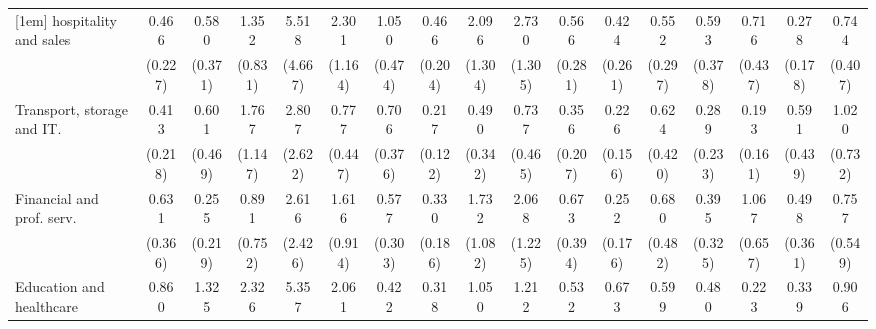 {\begin{tabular}{l*{16}{c}}
[1em]
hospitality and sales&       0.466         &       0.580         &       1.352         &       5.518\sym{*}  &       2.301         &       1.050         &       0.466         &       2.096         &       2.730\sym{*}  &       0.566         &       0.424         &       0.552         &       0.593         &       0.716         &       0.278\sym{*}  &       0.744         \\
                    &     (0.227)         &     (0.371)         &     (0.831)         &     (4.667)         &     (1.164)         &     (0.474)         &     (0.204)         &     (1.304)         &     (1.305)         &     (0.281)         &     (0.261)         &     (0.297)         &     (0.378)         &     (0.437)         &     (0.178)         &     (0.407)         \\
[1em]
Transport, storage and IT.&       0.413         &       0.601         &       1.767         &       2.807         &       0.777         &       0.706         &       0.217\sym{**} &       0.490         &       0.737         &       0.356         &       0.226\sym{*}  &       0.624         &       0.289         &       0.193\sym{*}  &       0.591         &       1.020         \\
                    &     (0.218)         &     (0.469)         &     (1.147)         &     (2.622)         &     (0.447)         &     (0.376)         &     (0.122)         &     (0.342)         &     (0.465)         &     (0.207)         &     (0.156)         &     (0.420)         &     (0.233)         &     (0.161)         &     (0.439)         &     (0.732)         \\
[1em]
Financial and prof. serv.&       0.631         &       0.255         &       0.891         &       2.616         &       1.616         &       0.577         &       0.330\sym{*}  &       1.732         &       2.068         &       0.673         &       0.252\sym{*}  &       0.680         &       0.395         &       1.067         &       0.498         &       0.757         \\
                    &     (0.366)         &     (0.219)         &     (0.752)         &     (2.426)         &     (0.914)         &     (0.303)         &     (0.186)         &     (1.082)         &     (1.225)         &     (0.394)         &     (0.176)         &     (0.482)         &     (0.325)         &     (0.657)         &     (0.361)         &     (0.549)         \\
[1em]
Education and healthcare&       0.860         &       1.325         &       2.326         &       5.357         &       2.061         &       0.422         &       0.318\sym{*}  &       1.050         &       1.212         &       0.532         &       0.673         &       0.599         &       0.480         &       0.223\sym{*}  &       0.339         &       0.906         \\

\end{tabular}}
